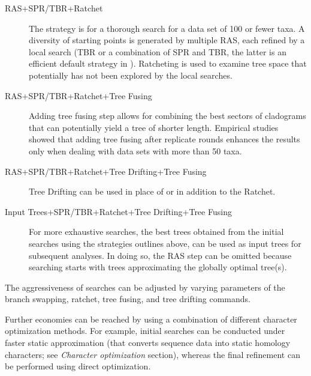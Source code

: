 \begin{description}
\item[RAS+SPR/TBR+Ratchet] The strategy is for a thorough search for a data set of 100 or fewer taxa. A diversity 
of starting points is generated by multiple RAS, each refined by a local search (TBR or a combination of SPR and TBR, 
the latter is an efficient default strategy in \poy). Ratcheting is used to examine tree space that potentially has not been 
explored by the local searches.
\item[RAS+SPR/TBR+Ratchet+Tree Fusing]  Adding tree fusing step allows for combining the best sectors of cladograms 
that can potentially yield a tree of shorter length. Empirical studies showed that adding tree fusing after replicate rounds 
enhances the results only when dealing with data sets with more than 50 taxa.
\item[RAS+SPR/TBR+Ratchet+Tree Drifting+Tree Fusing] Tree Drifting can be used in place of or in addition to the Ratchet.
\item[Input Trees+SPR/TBR+Ratchet+Tree Drifting+Tree Fusing] For more exhaustive searches, the best trees obtained 
from the initial searches using the strategies outlines above, can be used as input trees for subsequent analyses. In doing 
so, the RAS step can be omitted because searching starts with trees approximating the globally optimal tree(s).
\end{description}

The aggressiveness of searches can be adjusted by varying parameters of the branch swapping, ratchet, tree fusing, and 
tree drifting commands.

Further economies can be reached by using a combination of different character optimization methods. For example, 
initial searches can be conducted under faster static approximation (that converts sequence data into static homology 
characters; see \emph{Character optimization} section), whereas the final refinement can be performed using direct 
optimization.

